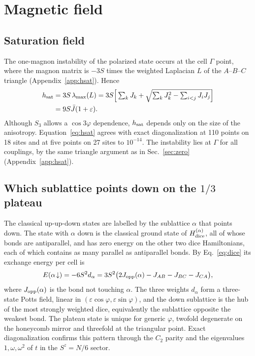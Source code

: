 \documentclass[prb,twocolumn,superscriptaddress,amsmath,amssymb,floatfix]{revtex4-2}
\newcommand{\Jb}{\bar J}
\begin{document}
\section{Magnetic field}
\label{sec:field}

\subsection{Saturation field}
The one-magnon instability of the polarized state occurs at the cell $\Gamma$ point, where the magnon matrix is $-3S$ times the weighted Laplacian $L$ of the $A$--$B$--$C$ triangle (Appendix~\ref{app:hsat}). Hence
\begin{align}
h_{\rm sat}&=3S\,\lambda_{\max}(L)=3S\Big[\textstyle\sum_kJ_k+\sqrt{\sum_kJ_k^2-\sum_{i<j}J_iJ_j}\Big]\nonumber\\
&=9S\Jb(1+\varepsilon).
\label{eq:hsat}
\end{align}
Although $S_3$ allows a $\cos3\varphi$ dependence, $h_{\rm sat}$ depends only on the size of the anisotropy. Equation~\eqref{eq:hsat} agrees with exact diagonalization at 110 points on 18 sites and at five points on 27 sites to $10^{-14}$. The instability lies at $\Gamma$ for all couplings, by the same triangle argument as in Sec.~\ref{sec:zero} (Appendix~\ref{app:hsat}).

\subsection{Which sublattice points down on the $1/3$ plateau}
The classical up-up-down states are labelled by the sublattice $\alpha$ that points down. The state with $\alpha$ down is the classical ground state of $H^{(\alpha)}_{\rm dice}$, all of whose bonds are antiparallel, and has zero energy on the other two dice Hamiltonians, each of which contains as many parallel as antiparallel bonds. By Eq.~\eqref{eq:dice} its exchange energy per cell is
\begin{equation}
E(\alpha\!\downarrow)=-6S^2d_\alpha=3S^2\big(2J_{\rm opp}(\alpha)-J_{AB}-J_{BC}-J_{CA}\big),
\label{eq:potts}
\end{equation}
where $J_{\rm opp}(\alpha)$ is the bond not touching $\alpha$. The three weights $d_\alpha$ form a three-state Potts field, linear in $(\varepsilon\cos\varphi,\varepsilon\sin\varphi)$, and the down sublattice is the hub of the most strongly weighted dice, equivalently the sublattice opposite the weakest bond. The plateau state is unique for generic $\varphi$, twofold degenerate on the honeycomb mirror and threefold at the triangular point. Exact diagonalization confirms this pattern through the $C_2$ parity and the eigenvalues $1,\omega,\omega^2$ of $t$ in the $S^z=N/6$ sector.
\end{document}
